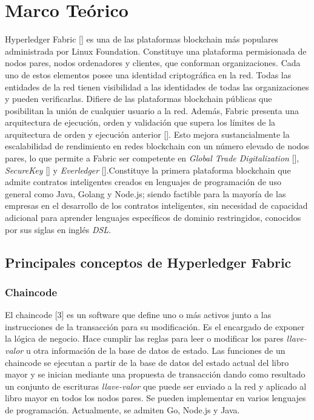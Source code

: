 \chapter{Marco Teórico}\label{chapter:theoretical_framework}

Hyperledger Fabric [\cite{HF}] es una de las plataformas blockchain m\'as populares administrada por Linux Foundation. Constituye una plataforma permisionada de nodos pares, nodos ordenadores y clientes, que conforman organizaciones. Cada uno de estos elementos posee una identidad criptogr\'afica en la red. Todas las entidades de la red tienen visibilidad a las identidades de todas las organizaciones y pueden verificarlas. Difiere de las plataformas blockchain p\'ublicas que posibilitan la uni\'on de cualquier usuario a la red. Adem\'as, Fabric presenta una arquitectura de ejecuci\'on, orden y validaci\'on que supera los l\'imites de la arquitectura de orden y ejecuci\'on anterior [\cite{androulaki2018hyperledger}]. Esto mejora sustancialmente la escalabilidad de rendimiento en redes blockchain con un n\'umero elevado de nodos pares, lo que permite a Fabric ser competente en \emph{Global Trade Digitalization} [\cite{digitizing-global}], \emph{SecureKey} [\cite{securekey}] y \emph{Everledger} [\cite{everledger}].Constituye la primera plataforma blockchain que admite contratos inteligentes creados en lenguajes de programaci\'on de uso general como Java, Golang y Node.js; siendo factible para la mayor\'ia de las empresas en el desarrollo de los contratos inteligentes, sin necesidad de capacidad adicional para aprender lenguajes espec\'ificos de dominio restringidos, conocidos por sus siglas en ingl\'es \emph{DSL}. 

\section{Principales conceptos de Hyperledger Fabric}

\subsection{Chaincode}
El chaincode [3] es un software que define uno o m\'as activos junto a las instrucciones de la transacci\'on para su modificaci\'on. Es el encargado de exponer la l\'ogica de negocio. Hace cumplir las reglas para leer o modificar los pares \emph{llave-valor} u otra informaci\'on de la base de datos de estado. Las funciones de un chaincode se ejecutan a partir de la base de datos del estado actual del libro mayor y se inician mediante una propuesta de transacci\'on dando como resultado un conjunto de escrituras \emph{llave-valor} que puede ser enviado a la red y aplicado al libro mayor en todos los nodos pares. Se pueden implementar en varios lenguajes de programaci\'on. Actualmente, se admiten Go, Node.js y Java.


